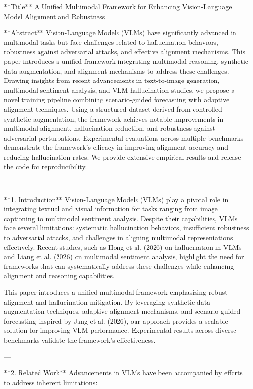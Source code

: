 **Title**  
A Unified Multimodal Framework for Enhancing Vision-Language Model Alignment and Robustness  

**Abstract**  
Vision-Language Models (VLMs) have significantly advanced in multimodal tasks but face challenges related to hallucination behaviors, robustness against adversarial attacks, and effective alignment mechanisms. This paper introduces a unified framework integrating multimodal reasoning, synthetic data augmentation, and alignment mechanisms to address these challenges. Drawing insights from recent advancements in text-to-image generation, multimodal sentiment analysis, and VLM hallucination studies, we propose a novel training pipeline combining scenario-guided forecasting with adaptive alignment techniques. Using a structured dataset derived from controlled synthetic augmentation, the framework achieves notable improvements in multimodal alignment, hallucination reduction, and robustness against adversarial perturbations. Experimental evaluations across multiple benchmarks demonstrate the framework's efficacy in improving alignment accuracy and reducing hallucination rates. We provide extensive empirical results and release the code for reproducibility.

---

**1. Introduction**  
Vision-Language Models (VLMs) play a pivotal role in integrating textual and visual information for tasks ranging from image captioning to multimodal sentiment analysis. Despite their capabilities, VLMs face several limitations: systematic hallucination behaviors, insufficient robustness to adversarial attacks, and challenges in aligning multimodal representations effectively. Recent studies, such as Hong et al. (2026) on hallucination in VLMs and Liang et al. (2026) on multimodal sentiment analysis, highlight the need for frameworks that can systematically address these challenges while enhancing alignment and reasoning capabilities.

This paper introduces a unified multimodal framework emphasizing robust alignment and hallucination mitigation. By leveraging synthetic data augmentation techniques, adaptive alignment mechanisms, and scenario-guided forecasting inspired by Jang et al. (2026), our approach provides a scalable solution for improving VLM performance. Experimental results across diverse benchmarks validate the framework's effectiveness.

---

**2. Related Work**  
Advancements in VLMs have been accompanied by efforts to address inherent limitations:  

